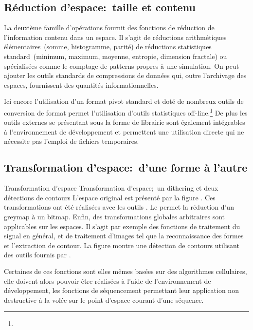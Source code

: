 \subsection{Réduction d'espace:~taille et contenu}

La deuxième famille d'opérations fournit des fonctions de réduction de
l'information contenu dans un espace. %
Il s'agit de réductions arithmétiques élémentaires~(somme,
histogramme, parité) de réductions statistiques standard~(minimum,
maximum, moyenne, entropie, dimension fractale) ou spécialisées comme
le comptage de patterns propres à une simulation. %
On peut ajouter les outils standards de compressions de données qui,
outre l'archivage des espaces, fournissent des quantités
informationnelles.

\noindent Ici encore l'utilisation d'un format pivot standard et doté
de nombreux outils de conversion de format permet l'utilisation
d'outils statistiques off-line.\footnote{%
  } %
De plus les outils externes se présentant sous la forme de librairie
sont également intégrables à l'environnement de développement et
permettent une utilisation directe qui ne nécessite pas l'emploi de
fichiers temporaires.

\subsection{Transformation d'espace:~d'une forme à l'autre}

%
{Transformation d'espace}%
{Transformation d'espace;~un dithering et deux détections de contours}%
{L'espace original est présenté par la figure . %
  Ces transformations ont été réalisées avec les outils .
  Le  permet la réduction d'un greymap à un bitmap.}
Enfin, des transformations globales arbitraires sont applicables sur
les espaces. %
Il s'agit par exemple des fonctions de traitement du signal en
général, et de traitement d'images tel que la reconnaissance des
formes et l'extraction de contour. %
La figure  montre une détection de contours
utilisant des outils fournis par . %

Certaines de ces fonctions sont elles mêmes basées sur des algorithmes
cellulaires, elle doivent alors pouvoir être réalisées à l'aide de
l'environnement de développement, les fonctions de séquencement
permettant leur application non destructive à la volée sur le point
d'espace courant d'une séquence.

